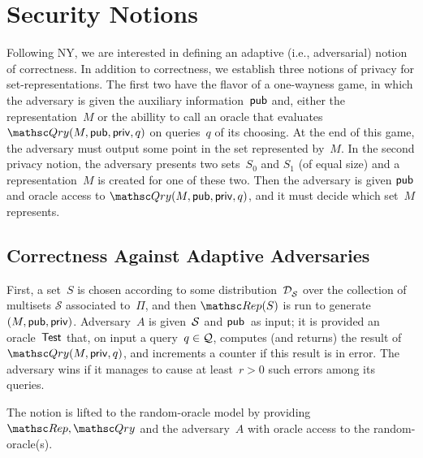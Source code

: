 \section{Security Notions}
\label{sec:security-notions}
Following NY, we are interested in defining an adaptive (i.e.,
adversarial) notion of correctness.   
In addition to correctness, we establish three notions of privacy for
set-representations. The first two have the flavor of a one-wayness game, in which the adversary is given the auxiliary information~${\sf pub}$ and, either the representation~$M$ or the abillity to call an oracle that evaluates $\Qry(M,\pubaux,\privaux,q)$ on queries~$q$ of its choosing.  At the end of this game, the adversary must output some point in the set represented by~$M$.  In the second privacy notion, the adversary presents two sets~$S_0$ and $S_1$ (of equal size) and a representation~$M$ is created for one of these two. Then the adversary is given ${\sf pub}$ and oracle access to $\Qry(M,\pubaux,\privaux,q)$, and it must decide which set~$M$ represents.

\subsection{Correctness Against Adaptive Adversaries}

First, a set~$S$ is chosen according to some
distribution~$\mathcal{D}_{{\cal S}}^{}$ over the collection of multisets
$\mathcal{S}$ associated to~$\Pi$, and then
$\Rep(S)$ is run to generate $(M,{\sf pub},{\sf priv})$.
Adversary~$A$ is given~${\cal S}$ and ${\sf pub}$~as input; it is
provided an oracle~$\mathsf{Test}$ that, on input a query~$q \in {\cal Q}$,
computes (and returns) the result of $\Qry(M,\privaux,q)$, and increments
a counter if this result is in error.  The adversary wins if it
manages to cause at least~$r>0$ such errors among its queries.

The notion is lifted to the random-oracle model by providing
$\Rep,\Qry$ and the adversary~$A$ with oracle access to the
random-oracle(s).



